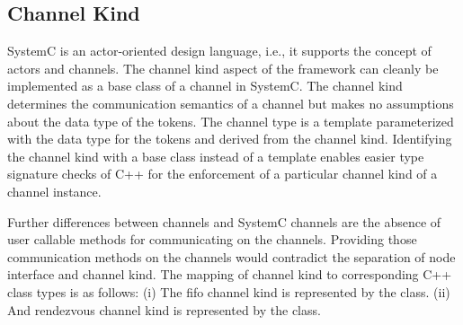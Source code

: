 
\subsection{Channel Kind}

SystemC is an actor-oriented design language, i.e., it supports the concept
of actors and channels. The channel kind aspect of the \SysteMoC{}
framework can cleanly be implemented as a base class of a channel in SystemC.
The channel kind determines the communication semantics of a channel but
makes no assumptions about the data type of the tokens.
The channel type is a template parameterized
with the data type for the tokens and derived from the channel kind.
Identifying the channel kind with a base class instead of a template enables
easier type signature checks of C++ for the enforcement of a particular
channel kind of a channel instance.

Further differences between \SysteMoC{} channels and SystemC channels are the
absence of user callable methods for communicating on the \SysteMoC{} channels.
Providing those communication methods on the channels would contradict the separation
of node interface and channel kind. The mapping of channel kind to corresponding C++
class types is as follows:
(i) The fifo channel kind is represented by the  class.
(ii) And rendezvous channel kind is represented by the  class.


